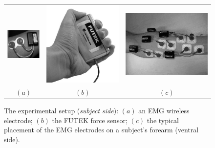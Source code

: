 \begin{figure}[!t] \centering
  \begin{tabular}{ccc}
    \includegraphics[height=0.16\textheight]{figs/Electrode} &
    \includegraphics[height=0.16\textheight]{figs/Hand_Gripper} &
    \includegraphics[height=0.16\textheight]{figs/El_Arrangement} \\
    $(a)$ & $(b)$ & $(c)$ \\
  \end{tabular}
  \caption{The experimental setup (\textit{subject side}): $(a)$ an EMG
    wireless electrode; $(b)$ the FUTEK force sensor; $(c)$ the typical
    placement of the EMG electrodes on a subject's forearm (ventral side).}
  \label{fig:SubjSetup}
\end{figure}

